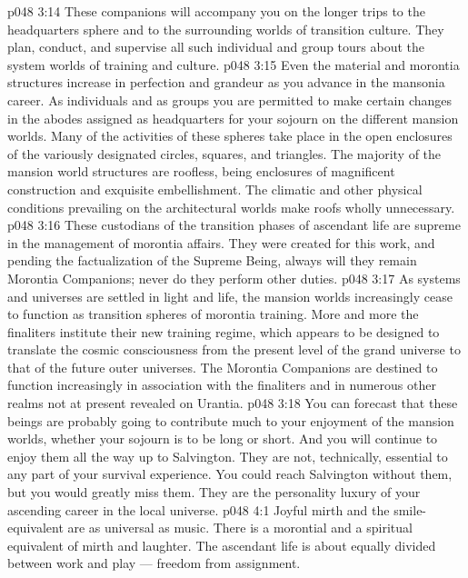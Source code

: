 \vs p048 3:14 \bibnobreakspace {} These companions will accompany you on the longer trips to the headquarters sphere and to the surrounding worlds of transition culture. They plan, conduct, and supervise all such individual and group tours about the system worlds of training and culture.
\vs p048 3:15 \bibnobreakspace {} Even the material and morontia structures increase in perfection and grandeur as you advance in the mansonia career. As individuals and as groups you are permitted to make certain changes in the abodes assigned as headquarters for your sojourn on the different mansion worlds. Many of the activities of these spheres take place in the open enclosures of the variously designated circles, squares, and triangles. The majority of the mansion world structures are roofless, being enclosures of magnificent construction and exquisite embellishment. The climatic and other physical conditions prevailing on the architectural worlds make roofs wholly unnecessary.
\vs p048 3:16 \pc These custodians of the transition phases of ascendant life are supreme in the management of morontia affairs. They were created for this work, and pending the factualization of the Supreme Being, always will they remain Morontia Companions; never do they perform other duties.
\vs p048 3:17 As systems and universes are settled in light and life, the mansion worlds increasingly cease to function as transition spheres of morontia training. More and more the finaliters institute their new training regime, which appears to be designed to translate the cosmic consciousness from the present level of the grand universe to that of the future outer universes. The Morontia Companions are destined to function increasingly in association with the finaliters and in numerous other realms not at present revealed on Urantia.
\vs p048 3:18 You can forecast that these beings are probably going to contribute much to your enjoyment of the mansion worlds, whether your sojourn is to be long or short. And you will continue to enjoy them all the way up to Salvington. They are not, technically, essential to any part of your survival experience. You could reach Salvington without them, but you would greatly miss them. They are the personality luxury of your ascending career in the local universe.
\vs p048 4:1 Joyful mirth and the smile\hyp{}equivalent are as universal as music. There is a morontial and a spiritual equivalent of mirth and laughter. The ascendant life is about equally divided between work and play --- freedom from assignment.
